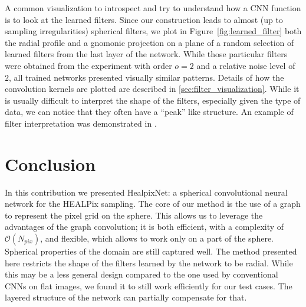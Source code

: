 \documentclass[final,twocolumn,3p,times,sort&compress]{elsarticle}
\newcommand{\TK}[1]{{\color{red}{TK:#1}}}
\newcommand{\figref}[1]{Figure~\ref{fig:#1}}
\newcommand{\1}{\b{1}}              %
\newcommand{\0}{\b{0}}              %
\begin{document}
A common visualization to introspect and try to understand how a CNN function is to look at the learned filters.
Since our construction leads to almost (up to sampling irregularities) spherical filters, we plot in \figref{learned_filter} both the radial profile and a gnomonic projection on a plane of a random selection of learned filters from the last layer of the network.
While those particular filters were obtained from the experiment with order $o=2$ and a relative noise level of $2$, all trained networks presented visually similar patterns.
Details of how the convolution kernels are plotted are described in \ref{sec:filter_visualization}.
While it is usually difficult to interpret the shape of the filters, especially given the type of data, we can notice that they often have a ``peak'' like structure.
An example of filter interpretation was demonstrated in \citep{Ribli2018learningfrom}.

\section{Conclusion}
\label{sec:conclusion}

In this contribution we presented HealpixNet: a spherical convolutional neural network for the HEALPix sampling.
The core of our method is the use of a graph to represent the pixel grid on the sphere.
This allows us to leverage the advantages of the graph convolution; it is both efficient, with a complexity of $\mathcal{O}(N_{pix})$, and flexible, which allows to work only on a part of the sphere.
Spherical properties of the domain are still captured well.
The method presented here restricts the shape of the filters learned by the network to be radial.
While this may be a less general design compared to the one used by conventional CNNs on flat images, we found it to still work efficiently for our test cases.
The layered structure of the network can partially compensate for that.
\end{document}
